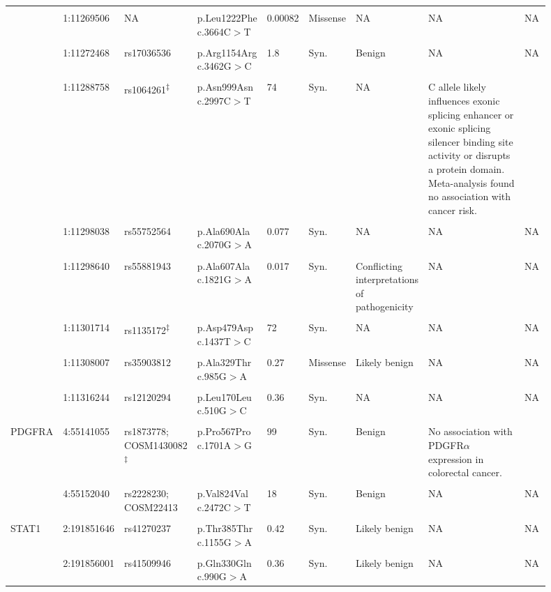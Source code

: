 \begin{landscape}
\begin{longtable}{p{0.07\linewidth}|p{0.09\linewidth}p{0.11\linewidth}p{0.1\linewidth}p{0.05\linewidth}p{0.065\linewidth}p{0.11\linewidth}p{0.25\linewidth}p{0.05\linewidth}}
		\\
		\\
		& 1:11269506 & NA & p.Leu1222Phe c.3664C$>$T & 0.00082 & Missense & NA & NA & NA
		\\
		\\
		& 1:11272468 & rs17036536 & p.Arg1154Arg c.3462G$>$C & 1.8 & Syn. & Benign & NA & NA
		\\
		\\
		& 1:11288758 & rs1064261\textsuperscript{$\ddagger$} & p.Asn999Asn c.2997C$>$T & 74 & Syn. & NA & C allele likely influences exonic splicing enhancer or exonic splicing silencer binding site activity or disrupts a protein domain. Meta-analysis found no association with cancer risk. & \cite{Zining2016}
		\\
		\\
		& 1:11298038 & rs55752564 & p.Ala690Ala c.2070G$>$A & 0.077 & Syn. & NA & NA & NA
		\\
		\\
		& 1:11298640 & rs55881943 & p.Ala607Ala c.1821G$>$A & 0.017 & Syn. & Conflicting \mbox{interpretations} of \mbox{pathogenicity} & NA & NA
		\\
		\\
		& 1:11301714 & rs1135172\textsuperscript{$\ddagger$} & p.Asp479Asp c.1437T$>$C & 72 & Syn. & NA & NA & NA
		\\
		\\
		& 1:11308007 & rs35903812 & p.Ala329Thr c.985G$>$A & 0.27 & Missense & Likely benign & NA & NA
		\\
		\\
		& 1:11316244 & rs12120294 & p.Leu170Leu c.510G$>$C & 0.36 & Syn. & NA & NA & NA
		\\
		\\
		\hline
		PDGFRA & 4:55141055 & rs1873778; COSM1430082\textsuperscript{$\ddagger$} & p.Pro567Pro c.1701A$>$G & 99 & Syn. & Benign & No association with PDGFR$\alpha$ \mbox{expression} in colorectal cancer. & \cite{Estevez-Garcia2012}
		\\
		\\
		& 4:55152040 & rs2228230; COSM22413 & p.Val824Val c.2472C$>$T & 18 & Syn. & Benign & NA & NA
		\\
		\\
		\hline
		STAT1 & 2:191851646 & rs41270237 & p.Thr385Thr c.1155G$>$A & 0.42 & Syn. & Likely benign & NA & NA
		\\
		\\
		& 2:191856001 & rs41509946 & p.Gln330Gln c.990G$>$A & 0.36 & Syn. & Likely benign & NA & NA

\end{longtable}
\end{landscape}
